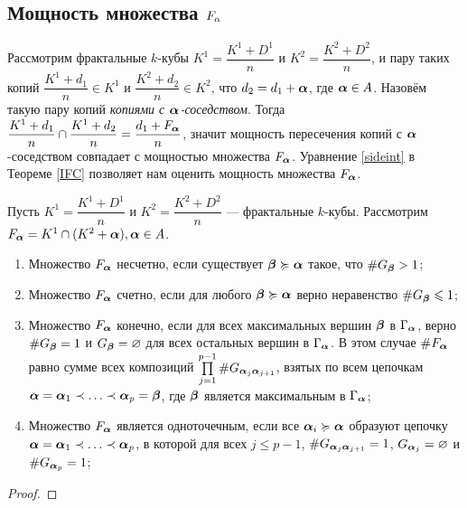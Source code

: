 \subsection{Мощность множества $F_\alpha$}

Рассмотрим фрактальные $k$-кубы $K^1=\dfrac{K^1+D^1}{n}$ и  $K^2=\dfrac{K^2+D^2}{n}$, и пару таких копий $\dfrac{K^1+d_1}{n}\in K^1$ и $\dfrac{K^2+d_2}{n}\in K^2$, что $d_2=d_1+{\bm{\alpha}}$, где ${\bm{\alpha}}\in A$.
Назовём такую пару копий {\em копиями с ${\bm{\alpha}}$-соседством}.
Тогда $\dfrac{K^1+d_1}{n}\cap\dfrac{K^1+d_2}{n}=\dfrac{d_1+F_{\bm{\alpha}}}{n}$, значит мощность пересечения копий с ${\bm{\alpha}}$-соседством совпадает с мощностью множества $F_{\bm{\alpha}}$.
Уравнение \eqref{sideint} в Теореме \ref{IFC} позволяет нам оценить мощность множества $F_{\bm{\alpha}}$.

\begin{theorem}
Пусть $K^1=\dfrac{K^1+D^1}{n}$ и $K^2=\dfrac{K^2+D^2}{n}$ --- фрактальные $k$-кубы. 
Рассмотрим $F_{\bm{\alpha}}=K^1\cap(K^2+{\bm{\alpha}}), {\bm{\alpha}}\in A$.
\begin{enumerate}[nolistsep]
\item Множество $F_{\bm{\alpha}}$ несчетно, если существует ${\bm{\beta}}\succcurlyeq{\bm{\alpha}}$ такое, что $\#G_{\bm{\beta}}>1$;

\item Множество $F_{\bm{\alpha}}$ счетно, если для любого ${\bm{\beta}}\succcurlyeq{\bm{\alpha}}$ верно неравенство $\#G_{\bm{\beta}}\leqslant1$;

\item Множество $F_{\bm{\alpha}}$ конечно, если для всех максимальных вершин ${\bm{\beta}}$ в $\Gamma_{\bm{\alpha}}$, верно $\#G_{\bm{\beta}}=1$ и $G_{{\bm{\beta}}}=\varnothing$ для всех остальных вершин в $\Gamma_{\bm{\alpha}}$.
В этом случае $\#F_{\bm{\alpha}}$ равно сумме всех композиций $\prod \limits_{j=1}^{p-1}\# G_{{\bm{\alpha}}_j{\bm{\alpha}}_{j+1}}$, взятых по всем цепочкам ${\bm{\alpha}}={\bm{\alpha}}_1\prec\ldots\prec{\bm{\alpha}}_p={\bm{\beta}}$, где ${\bm{\beta}}$ является максимальным в $\Gamma_{\bm{\alpha}}$;

\item Множество $F_{\bm{\alpha}}$ является одноточечным, если все ${\bm{\alpha}}_i\succcurlyeq{\bm{\alpha}}$ образуют цепочку ${\bm{\alpha}}={\bm{\alpha}}_1\prec\ldots\prec{\bm{\alpha}}_p$, в которой для всех $j\le p-1$, $\# G_{{\bm{\alpha}}_j{\bm{\alpha}}_{j+1}}=1$, $G_{{\bm{\alpha}}_j}=\varnothing$ и $\#G_{{\bm{\alpha}}_p}=1$;
\end{enumerate}
\end{theorem}


\begin{proof}

\end{proof}


